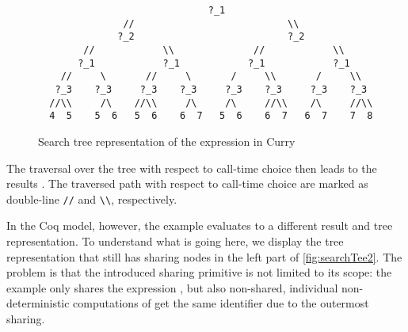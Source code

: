 \begin{figure}[h]
\centering
\begin{BVerbatim}
                              ?_1
               //                           \\
              ?_2                           ?_2
        //            \\              //            \\
       ?_1            ?_1            ?_1            ?_1
    //     \       //     \       /     \\       /     \\
   ?_3    ?_3     ?_3    ?_3     ?_3    ?_3     ?_3    ?_3
  //\\     /\    //\\     /\     /\     //\\    /\     //\\
  4  5    5  6   5  6    6  7   5  6    6  7   6  7    7  8
\end{BVerbatim}
\caption{Search tree representation of the expression 
  in Curry}
\label{fig:searchTree}
\end{figure}

The traversal over the tree with respect to call-time choice then leads to the results .
The traversed path with respect to call-time choice are marked as double-line \verb|//| and \verb|\\|, respectively.

In the Coq model, however, the example evaluates to a different result and tree representation.
To understand what is going here, we display the tree representation that still has sharing nodes in the left part of \autoref{fig:searchTee2}.
The problem is that the introduced sharing primitive is not limited to its scope: the example only shares the expression , but also non-shared, individual non-deterministic computations of  get the same identifier due to the outermost sharing.

